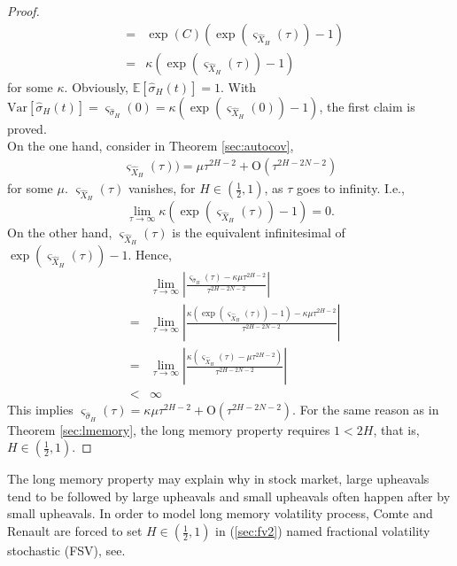 \documentclass[a4paper, twoside, 11pt]{article}
\theoremstyle{definition}
\begin{document}
\begin{proof}
\begin{eqnarray*}
	&=& \exp(C)(\exp(\varsigma_{\hat{X}_{H}}(\tau)) - 1)\\
	&=& \kappa(\exp(\varsigma_{\hat{X}_{H}}(\tau)) - 1)
 \end{eqnarray*}
 for some $\kappa$. Obviously, $\mathbb{E}[\hat{\sigma}_{H}(t)]=1$. With $ \mathrm{Var}[\hat{\sigma}_{H}(t)]=\varsigma_{\hat{\sigma}_H}(0) = \kappa(\exp(\varsigma_{\hat{X}_{H}}(0)) - 1)$, the first claim is proved.\\
 On the one hand, consider in Theorem \ref{sec:autocov},
\begin{eqnarray*}
  \varsigma_{\hat{X}_{H}}(\tau)) = \mu \tau^{2H-2} + \mathrm{O}(\tau^{{2H-2N-2}})
\end{eqnarray*}
for some $\mu$.
 $\varsigma_{\hat{X}_{H}}(\tau)$ vanishes, for $H\in(\frac{1}{2}, 1)$, as $\tau$ goes to infinity. I.e.,
 $$
 \lim\limits_{\tau\rightarrow \infty}\kappa(\exp(\varsigma_{\hat{X}_{H}}(\tau)) - 1) = 0.
 $$
 On the other hand, 
 $\varsigma_{\hat{X}_{H}}(\tau)$ is the equivalent infinitesimal of $\exp(\varsigma_{\hat{X}_{H}}(\tau)) - 1$. Hence,
\begin{eqnarray*}
  &&  \lim\limits_{\tau\rightarrow \infty} |\frac{\varsigma_{\hat{\sigma}_H}(\tau) - \kappa \mu \tau^{2H-2}}{\tau^{{2H-2N-2}}}|\\
  &=& \lim\limits_{\tau\rightarrow \infty} |\frac{\kappa(\exp(\varsigma_{\hat{X}_{H}}(\tau)) - 1) - \kappa \mu \tau^{2H-2}}{\tau^{{2H-2N-2}}}|\\
  &=& \lim\limits_{\tau\rightarrow \infty} |\frac{\kappa(\varsigma_{\hat{X}_{H}}(\tau) - \mu\tau^{2H-2})}{\tau^{{2H-2N-2}}}|\\
  &<& \infty
\end{eqnarray*}
This implies $\varsigma_{\hat{\sigma}_H}(\tau) = \kappa\mu \tau^{2H-2} + \mathrm{O}(\tau^{{2H-2N-2}})$. For the same reason as in Theorem \ref{sec:lmemory}, the long memory property requires $1<2H$, that is, $H\in(\frac{1}{2}, 1)$.
\end{proof}

The long memory property may explain why in stock market, large upheavals tend to be followed by large upheavals and small upheavals often happen after by small upheavals.  In order to model long memory volatility process, Comte and Renault are forced to set $H\in (\frac{1}{2}, 1)$ in (\ref{sec:fv2}) named fractional volatility stochastic (FSV), see\cite{comren}. \\
\end{document}
